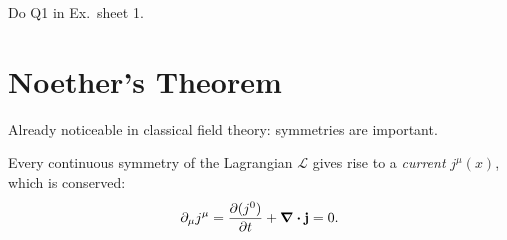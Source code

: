 \begin{example}
Do Q1 in Ex.~sheet 1.
\end{example}

\section{Noether's Theorem}%
\label{sec:noether_s_theorem}

Already noticeable in classical field theory: symmetries are important.

\begin{theorem}
  Every continuous symmetry of the Lagrangian $\mathcal{L}$ gives rise to a \emph{current} $j^\mu(x)$, which is conserved:
  \begin{equation}
    \partial_\mu j^\mu = \pdv{(j^0)}{t} + \div \vb{j} = 0.
  \end{equation}
\end{theorem}

